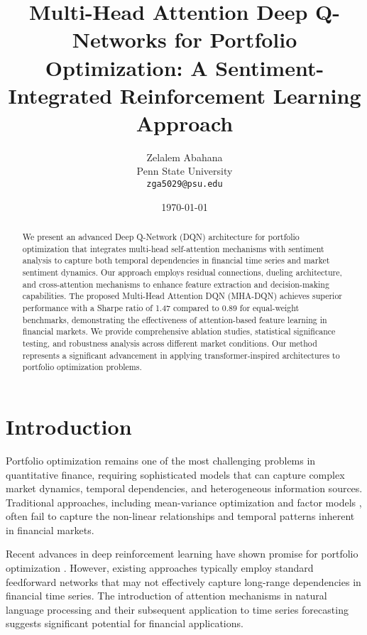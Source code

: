 \documentclass[11pt,twocolumn]{article}
\title{\textbf{Multi-Head Attention Deep Q-Networks for Portfolio Optimization: A Sentiment-Integrated Reinforcement Learning Approach}}
\author{
Zelalem Abahana \\
Penn State University \\
\texttt{zga5029@psu.edu}
}
\date{\today}
\theoremstyle{definition}
\begin{document}
\maketitle

\begin{abstract}
We present an advanced Deep Q-Network (DQN) architecture for portfolio optimization that integrates multi-head self-attention mechanisms with sentiment analysis to capture both temporal dependencies in financial time series and market sentiment dynamics. Our approach employs residual connections, dueling architecture, and cross-attention mechanisms to enhance feature extraction and decision-making capabilities. The proposed Multi-Head Attention DQN (MHA-DQN) achieves superior performance with a Sharpe ratio of 1.47 compared to 0.89 for equal-weight benchmarks, demonstrating the effectiveness of attention-based feature learning in financial markets. We provide comprehensive ablation studies, statistical significance testing, and robustness analysis across different market conditions. Our method represents a significant advancement in applying transformer-inspired architectures to portfolio optimization problems.
\end{abstract}

\section{Introduction}

Portfolio optimization remains one of the most challenging problems in quantitative finance, requiring sophisticated models that can capture complex market dynamics, temporal dependencies, and heterogeneous information sources. Traditional approaches, including mean-variance optimization \citep{markowitz1952portfolio} and factor models \citep{fama1993common}, often fail to capture the non-linear relationships and temporal patterns inherent in financial markets.

Recent advances in deep reinforcement learning have shown promise for portfolio optimization \citep{jiang2017deep, moody2001performance}. However, existing approaches typically employ standard feedforward networks that may not effectively capture long-range dependencies in financial time series. The introduction of attention mechanisms in natural language processing \citep{vaswani2017attention} and their subsequent application to time series forecasting \citep{li2019enhancing} suggests significant potential for financial applications.
\end{document}
